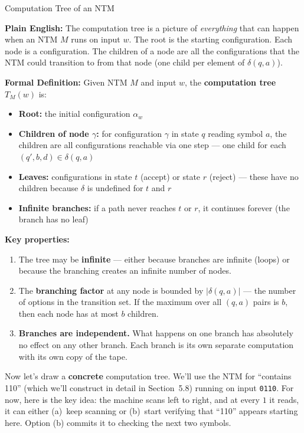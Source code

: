 \begin{definitionbox}{Computation Tree of an NTM}

\textbf{Plain English:}
The computation tree is a picture of \emph{everything} that can happen when an
NTM $M$ runs on input $w$. The root is the starting configuration. Each node is
a configuration. The children of a node are all the configurations that the NTM
could transition to from that node (one child per element of $\delta(q, a)$).

\textbf{Formal Definition:}
Given NTM $M$ and input $w$, the \textbf{computation tree} $T_M(w)$ is:
\begin{itemize}[nosep]
\item \textbf{Root:} the initial configuration $\alpha_w$
\item \textbf{Children of node $\gamma$:} for configuration $\gamma$ in state
  $q$ reading symbol $a$, the children are all configurations reachable via one
  step --- one child for each $(q', b, d) \in \delta(q, a)$
\item \textbf{Leaves:} configurations in state $t$ (accept) or state $r$
  (reject) --- these have no children because $\delta$ is undefined for $t$
  and $r$
\item \textbf{Infinite branches:} if a path never reaches $t$ or $r$, it
  continues forever (the branch has no leaf)
\end{itemize}

\textbf{Key properties:}
\begin{enumerate}[nosep]
\item The tree may be \textbf{infinite} --- either because branches are infinite
  (loops) or because the branching creates an infinite number of nodes.
\item The \textbf{branching factor} at any node is bounded by $|\delta(q, a)|$
  --- the number of options in the transition set. If the maximum over all
  $(q, a)$ pairs is $b$, then each node has at most $b$ children.
\item \textbf{Branches are independent.} What happens on one branch has
  absolutely no effect on any other branch. Each branch is its own separate
  computation with its own copy of the tape.
\end{enumerate}
\end{definitionbox}

Now let's draw a \textbf{concrete} computation tree. We'll use the NTM for
``contains 110'' (which we'll construct in detail in Section~5.8) running on
input \texttt{0110}. For now, here is the key idea: the machine scans left to
right, and at every $1$ it reads, it can either (a)~keep scanning or (b)~start
verifying that ``110'' appears starting here. Option (b) commits it to checking
the next two symbols.

